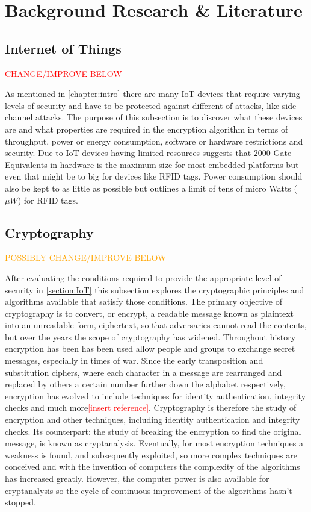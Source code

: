 \documentclass[12pt,twoside,a4paper]{report}
\begin{document}
	\chapter{Background Research \& Literature}
	\label{chapter:BACK}
    
	\section{Internet of Things}
	\label{section:IoT}
    
	\textcolor{red}{CHANGE/IMPROVE BELOW}
    
	As mentioned in \autoref{chapter:intro} there are many IoT devices that require varying levels of security and have to be protected against different of attacks, like side channel attacks. The purpose of this subsection is to discover what these devices are and what properties are required in the encryption algorithm in terms of throughput, power or energy consumption, software or hardware restrictions and security. Due to IoT devices having limited resources \cite{Juels2005} suggests that 2000 Gate Equivalents in hardware is the maximum size for most embedded platforms but even that might be to big for devices like RFID tags. Power consumption should also be kept to as little as possible but \cite{David2011} outlines a limit of tens of micro Watts ($\mu W$) for RFID tags.
    
	\section{Cryptography}
	\label{section:crypt}
    
	\textcolor{orange}{POSSIBLY CHANGE/IMPROVE BELOW}
    
	After evaluating the conditions required to provide the appropriate level of security  in \autoref{section:IoT} this subsection explores the cryptographic principles and algorithms available that satisfy those conditions. The primary objective of cryptography is to convert, or encrypt, a readable message known as plaintext into an unreadable form, ciphertext, so that adversaries cannot read the contents, but over the years the scope of cryptography has widened. Throughout history encryption has been has been used allow people and groups to exchange secret messages, especially in times of war. Since the early transposition and substitution ciphers, where each character in a message are rearranged and replaced by others a certain number further down the alphabet respectively, encryption has evolved to include techniques for identity authentication, integrity checks and much more\textcolor{red}{[insert reference]}. Cryptography is therefore the study of encryption and other techniques, including identity authentication and integrity checks. Its counterpart: the study of breaking the encryption to find the original message, is known as cryptanalysis\cite{AlfredJ.Menezes1996}. Eventually, for most encryption techniques a weakness is found, and subsequently exploited, so more complex techniques are conceived and with the invention of computers the complexity of the algorithms has increased greatly. However, the computer power is also available for cryptanalysis so the cycle of continuous improvement of the algorithms hasn't stopped.
    
\end{document}
